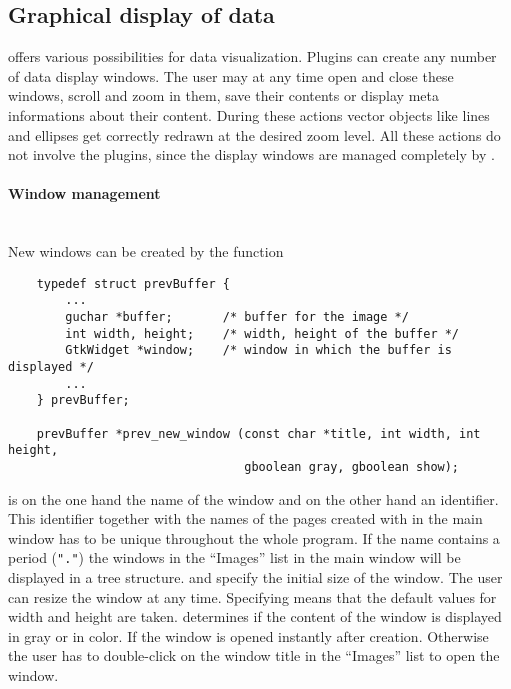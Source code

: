 \subsection{Graphical display of data}
\label{sub:p_rendering}

\icewing{} offers various possibilities for data
visualization. Plugins can create any number of data display
windows. The user may at any time open and close these windows,
scroll and zoom in them, save their contents or display meta
informations about their content. During these actions vector
objects like lines and ellipses get correctly redrawn at the desired
zoom level. All these actions do not involve the plugins, since the
display windows are managed completely by \icewing{}.

\paragraph{Window management}\hfill\\

New windows can be created by the function
\begin{small}
\linespread{0.9}
\begin{verbatim}
    typedef struct prevBuffer {
        ...
        guchar *buffer;       /* buffer for the image */
        int width, height;    /* width, height of the buffer */
        GtkWidget *window;    /* window in which the buffer is displayed */
        ...
    } prevBuffer;

    prevBuffer *prev_new_window (const char *title, int width, int height,
                                 gboolean gray, gboolean show);
\end{verbatim}
\end{small}
 is on the one hand the name of the window and on the
other hand an identifier. This identifier together with the names of
the pages created with  in the \icewing{}
main window has to be unique throughout the whole program. If the
name contains a period (\verb|"."|) the windows in the ``Images''
list in the main window will be displayed in a tree
structure.  and  specify the initial size of
the window. The user can resize the window at any time. Specifying
 means that the default values for width and height are
taken.  determines if the content of the window is
displayed in gray or in color. If  the window is
opened instantly after creation. Otherwise the user has to
double-click on the window title in the ``Images'' list to open the
window.

